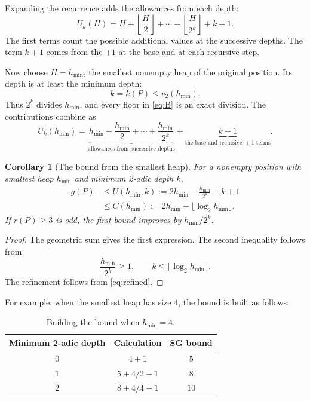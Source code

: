 \documentclass[11pt]{article}
\newtheorem{corollary}[theorem]{Corollary}
\begin{document}
Expanding the recurrence adds the allowances from each depth:
\begin{equation}
 U_k(H)=
 H+\left\lfloor\frac H2\right\rfloor
 +\cdots+
 \left\lfloor\frac H{2^k}\right\rfloor
 +k+1.
 \label{eq:B}
\end{equation}
The first terms count the possible additional values at the
successive depths. The term $k+1$ comes from the $+1$ at the
base and at each recursive step.

Now choose $H=h_{\min}$, the smallest nonempty heap of the
original position. Its depth is at least the minimum depth:
\[
 k=k(P)\le v_2(h_{\min}).
\]
Thus $2^k$ divides $h_{\min}$, and every floor in
\eqref{eq:B} is an exact division. The contributions combine as
\[
 U_k(h_{\min})
 =
 \underbrace{
 h_{\min}+\frac{h_{\min}}2+\cdots+
 \frac{h_{\min}}{2^k}
 }_{\text{allowances from successive depths}}
 +
 \underbrace{k+1}_{\text{the base and recursive }+1\text{ terms}}.
\]

\begin{corollary}[The bound from the smallest heap]
\label{cor:closed}
For a nonempty position with smallest heap $h_{\min}$ and
minimum 2-adic depth $k$,
\begin{equation}
 \boxed{
 \begin{aligned}
 g(P)
 &\le U(h_{\min},k)
 :=2h_{\min}-\frac{h_{\min}}{2^k}+k+1 \\
 &\le C(h_{\min})
 :=2h_{\min}+\lfloor\log_2h_{\min}\rfloor.
 \end{aligned}
 }
 \label{eq:closed}
\end{equation}
If $r(P)\ge3$ is odd, the first bound improves by
$h_{\min}/2^k$.
\end{corollary}

\begin{proof}
The geometric sum gives the first expression.
The second inequality follows from
\[
 \frac{h_{\min}}{2^k}\ge1,
 \qquad
 k\le\lfloor\log_2h_{\min}\rfloor.
\]
The refinement follows from \eqref{eq:refined}.
\end{proof}

For example, when the smallest heap has size $4$, the bound
is built as follows:

\begin{table}[H]
\centering
\small
\begin{tabular}{@{}c c c@{}}
\toprule
Minimum 2-adic depth & Calculation & SG bound \\
\midrule
$0$ & $4+1$ & $5$ \\
$1$ & $5+4/2+1$ & $8$ \\
$2$ & $8+4/4+1$ & $10$ \\
\bottomrule
\end{tabular}
\caption{Building the bound when $h_{\min}=4$.}
\label{tab:examplebound}
\end{table}
\end{document}
